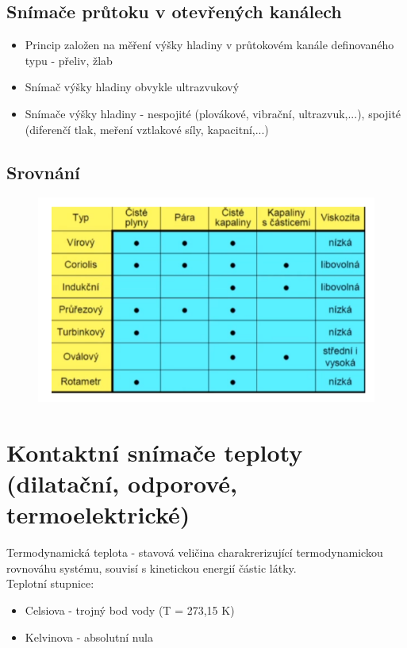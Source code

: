 \subsection*{Snímače průtoku v otevřených kanálech}
\begin{itemize}
    \item Princip založen na měření výšky hladiny v průtokovém kanále definovaného typu - přeliv, žlab
    \item Snímač výšky hladiny obvykle ultrazvukový
    \item Snímače výšky hladiny - nespojité (plovákové, vibrační, ultrazvuk,...), spojité (diferenčí tlak, meření vztlakové síly, kapacitní,...)
\end{itemize}

\subsection*{Srovnání}

\begin{figure}[h]
    \centering
    \includegraphics[scale = 1]{img/srovnaniprutok.png}
\end{figure}

\section{Kontaktní snímače teploty (dilatační, odporové, termoelektrické)}
Termodynamická teplota - stavová veličina charakrerizující termodynamickou rovnováhu systému, souvisí s kinetickou energií částic látky.\\
Teplotní stupnice:
\begin{itemize}
    \item Celsiova  - trojný bod vody (T = 273,15 K)
    \item Kelvinova - absolutní nula
\end{itemize}
